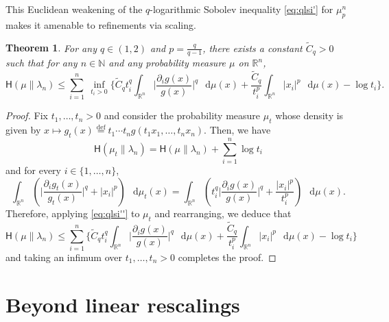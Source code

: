 \documentclass[a4paper,twoside,11pt,reqno]{amsart}
\newcommand{\eqdef}{\stackrel{\mathrm{def}}{=}}
\newtheorem{theorem}{Theorem}
\newcommand*\diff{\mathop{}\!\mathrm{d}}
\newcommand{\R}{\mathbb{R}} %
\newcommand{\N}{\mathbb{N}}
\newcommand{\msf}{\mathsf}
\begin{document}
This Euclidean weakening of the $q$-logarithmic Sobolev inequality \eqref{eq:qlsi'} for $\mu_p^n$ makes it amenable to refinements via scaling.

\begin{theorem}
For any $q\in(1,2)$ and $p=\tfrac{q}{q-1}$, there exists a constant $\tilde{C}_q>0$ such that for any $n\in\N$ and any probability measure $\mu$ on $\R^n$,
\begin{equation} \label{eq:qlsi'''}
\msf{H}(\mu\|\lambda_n) \leq \sum_{i=1}^n \ \inf_{t_i>0} \Big\{ \tilde{C}_q t_i^q \int_{\R^n} \Big| \frac{\partial_ig(x)}{g(x)}\Big|^q \,\diff\mu(x) + \frac{\tilde{C}_q}{t_i^p} \int_{\R^n} |x_i|^p\,\diff\mu(x) - \log t_i \Big\}.
\end{equation}
\end{theorem}

\begin{proof}
Fix $t_1,\ldots,t_n>0$ and consider the probability measure $\mu_t$ whose density is given by $x\mapsto g_t(x)\eqdef t_1\cdots t_n g(t_1x_1,\ldots,t_nx_n)$. Then, we have
\begin{equation}
\msf{H}(\mu_t\|\lambda_n) = \msf{H}(\mu\|\lambda_n)+ \sum_{i=1}^n \log t_i
\end{equation}
and for every $i\in\{1,\ldots,n\}$,
\begin{equation}
\int_{\R^n} \left(\Big| \frac{\partial_i g_t(x)}{g_t(x)}\Big|^q + |x_i|^p \right)\,\diff\mu_t(x) = \int_{\R^n} \left(t_i^q \Big| \frac{\partial_i g(x)}{g(x)}\Big|^q + \frac{|x_i|^p}{t_i^p}\right) \,\diff\mu(x).
\end{equation}
Therefore, applying \eqref{eq:qlsi''} to $\mu_t$ and rearranging, we deduce that
\begin{equation}
\msf{H}(\mu\|\lambda_n) \leq \sum_{i=1}^n  \Big\{ \tilde{C}_q t_i^q \int_{\R^n} \Big| \frac{\partial_ig(x)}{g(x)}\Big|^q \,\diff\mu(x) + \frac{\tilde{C}_q}{t_i^p} \int_{\R^n} |x_i|^p\,\diff\mu(x) - \log t_i \Big\}
\end{equation}
and taking an infimum over $t_1,\ldots,t_n>0$ completes the proof.
\end{proof}



\section{Beyond linear rescalings}
\end{document}
